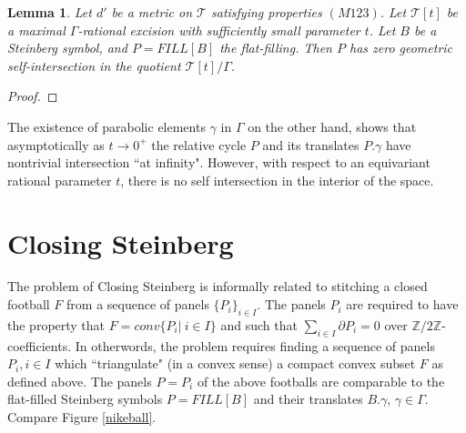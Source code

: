 \documentclass[12pt]{amsart}
\newtheorem{lem}[thm]{Lemma}
\theoremstyle{definition}
\theoremstyle{remark}
\newcommand{\bZ}{\mathbb{Z}}
\newcommand{\del}{\partial}
\newcommand{\bD}{\mathbb{D}}
\newcommand{\sT}{\mathscr{T}}
\begin{document}
\begin{lem}\label{kl}
Let $d'$ be a metric on $\sT$ satisfying properties $(M123)$. Let $\sT[t]$ be a maximal $\Gamma$-rational excision with sufficiently small parameter $t$. Let $B$ be a Steinberg symbol, and $P=FILL[B]$ the flat-filling. Then $P$ has zero geometric self-intersection in the quotient $\sT[t]/\Gamma$.
\end{lem}
\begin{proof}

\end{proof}

The existence of parabolic elements $\gamma$ in $\Gamma$ on the other hand, shows that asymptotically as $t\to 0^+$ the relative cycle $P$ and its translates $P.\gamma$ have nontrivial intersection ``at infinity". However, with respect to an equivariant rational parameter $t$, there is no self intersection in the interior of the space.






\section{Closing Steinberg}\label{CS}
The problem of Closing Steinberg is informally related to stitching a closed football $F$ from a sequence of panels $\{P_i\}_{i\in I}$. The panels $P_i$ are required to have the property that $F=conv\{P_i|~i\in I\}$ and such that $\sum_{i\in I} \del P_i=0$ over $\bZ/2\bZ$-coefficients. In otherwords, the problem requires finding a sequence of panels $P_i, i\in I$ which ``triangulate" (in a convex sense) a compact convex subset $F$ as defined above. The panels $P=P_i$ of the above footballs are comparable to the flat-filled Steinberg symbols $P=FILL[B]$ and their translates $B.\gamma$, $\gamma\in \Gamma$. Compare Figure \ref{nikeball}.


\end{document}

